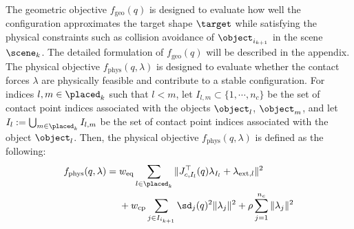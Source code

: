 The geometric objective $f_\text{geo}(q)$ is designed to evaluate how well the configuration approximates the target shape $\target$ while satisfying the physical constraints such as collision avoidance of $\object_{i_{k+1}}$ in the scene $\scene_k$.
The detailed formulation of $f_\text{geo}(q)$ will be described in the appendix.
The physical objective $f_\text{phys}(q,\lambda)$ is designed to evaluate whether the contact forces $\lambda$ are physically feasible and contribute to a stable configuration.
For indices $l, m \in \placed_k$ such that $l < m$, let $I_{l,m} \subset \{1,\cdots,n_c\}$ be the set of contact point indices associated with the objects $\object_l$, $\object_m$, and let $I_{l} := \bigcup_{m \in \placed_k} I_{l,m}$ be the set of contact point indices associated with the object $\object_l$.
Then, the physical objective $f_\text{phys}(q,\lambda)$ is defined as the following:
\begin{equation}
  \begin{split}
    f_\text{phys}(q,\lambda) \label{eq:force_objective}
    ={}& w_\text{eq}\sum_{l \in \placed_k} \|J_{c,I_l}^\top(q)  \lambda_{I_l} + \lambda_{\text{ext},l}\|^2 \\
    &+ w_\text{cp}\sum_{j \in I_{i_{k+1}}}\sd_j(q)^2 \|\lambda_j\|^2 + \rho\sum_{j = 1}^{n_c} \|\lambda_j\|^2    
  \end{split} 
\end{equation}
